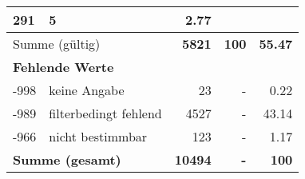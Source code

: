 \begin{longtable}{lXrrr}
       \num{291} &
       \num[round-mode=places,round-precision=2]{5} &
         \num[round-mode=places,round-precision=2]{2.77} \\
     \midrule
     \multicolumn{2}{l}{Summe (gültig)} &
       \textbf{\num{5821}} &
     \textbf{\num{100}} &
       \textbf{\num[round-mode=places,round-precision=2]{55.47}} \\
     \multicolumn{5}{l}{\textbf{Fehlende Werte}}\\
       -998 &
       keine Angabe &
         \num{23} &
        - &
         \num[round-mode=places,round-precision=2]{0.22} \\
       -989 &
       filterbedingt fehlend &
         \num{4527} &
        - &
         \num[round-mode=places,round-precision=2]{43.14} \\
       -966 &
       nicht bestimmbar &
         \num{123} &
        - &
         \num[round-mode=places,round-precision=2]{1.17} \\
     \midrule
     \multicolumn{2}{l}{\textbf{Summe (gesamt)}} &
          \textbf{\num{10494}} &
        \textbf{-} &
        \textbf{\num{100}} \\
     \bottomrule
     \end{longtable}
     
